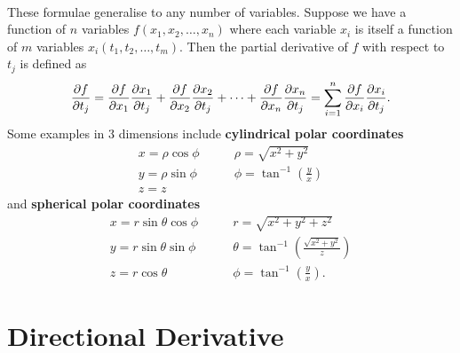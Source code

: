 \documentclass[../multivariate_calculus.tex]{subfiles}
\begin{document}
        \paragraph{}
        These formulae generalise to any number of variables.
        Suppose we have a function of $n$ variables $f(x_1,x_2,\dots,x_n)$ where each variable $x_i$ is itself a function of $m$ variables $x_i(t_1,t_2,\dots,t_m)$.
        Then the partial derivative of $f$ with respect to $t_j$ is defined as
        \begin{equation}
            \pdv{f}{t_j}=\pdv{f}{x_1}\pdv{x_1}{t_j}+\pdv{f}{x_2}\pdv{x_2}{t_j}+\dots+\pdv{f}{x_n}\pdv{x_n}{t_j}=\sum_{i=1}^n\pdv{f}{x_i}\pdv{x_i}{t_j}.
        \end{equation}
        Some examples in 3 dimensions include \textbf{cylindrical polar coordinates}
        \begin{align}
            x=\rho\cos\phi\quad&\quad\rho=\sqrt{x^2+y^2}\\
            y=\rho\sin\phi\quad&\quad\phi=\tan^{-1}\left(\frac{y}{x}\right)\\
            z=z\quad&
        \end{align}
        and \textbf{spherical polar coordinates}
        \begin{align}
            x=r\sin\theta\cos\phi\quad&\quad r=\sqrt{x^2+y^2+z^2}\\
            y=r\sin\theta\sin\phi\quad&\quad\theta=\tan^{-1}\left(\frac{\sqrt{x^2+y^2}}{z}\right)\\
            z=r\cos\theta\quad&\quad\phi=\tan^{-1}\left(\frac{y}{x}\right).
        \end{align}

    \section{Directional Derivative}
\end{document}

